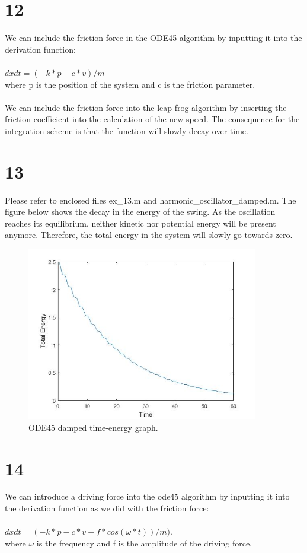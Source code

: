 \documentclass[12pt, a4paper]{article}
\begin{document}
	\part*{12}
	We can include the friction force in the ODE45 algorithm by inputting it into the derivation function:\\\\
	$dxdt = (-k * p - c * v)/m$\\
	where p is the position of the system and c is the friction parameter.\\\\
	We can include the friction force into the leap-frog algorithm by inserting the friction coefficient into the calculation of the new speed.
	The consequence for the integration scheme is that the function will slowly decay over time.
	\part*{13}
	Please refer to enclosed files ex\_13.m and harmonic\_oscillator\_damped.m. The figure below shows the decay in the energy of the swing. As the oscillation reaches its equilibrium, neither kinetic nor potential energy will be present anymore. Therefore, the total energy in the system will slowly go towards zero.
	\begin{figure}[!ht]
		\centering
		\includegraphics[width=0.9\textwidth]{13}
		\caption{ODE45 damped time-energy graph.}
	\end{figure}
	\part*{14}
	We can introduce a driving force into the ode45 algorithm by inputting it into the derivation function as we did with the friction force:\\\\
	$dxdt = (-k * p - c * v + f * cos(\omega * t))/m)$.\\
	where $\omega$ is the frequency and f is the amplitude of the driving force.\\\\
\end{document}
